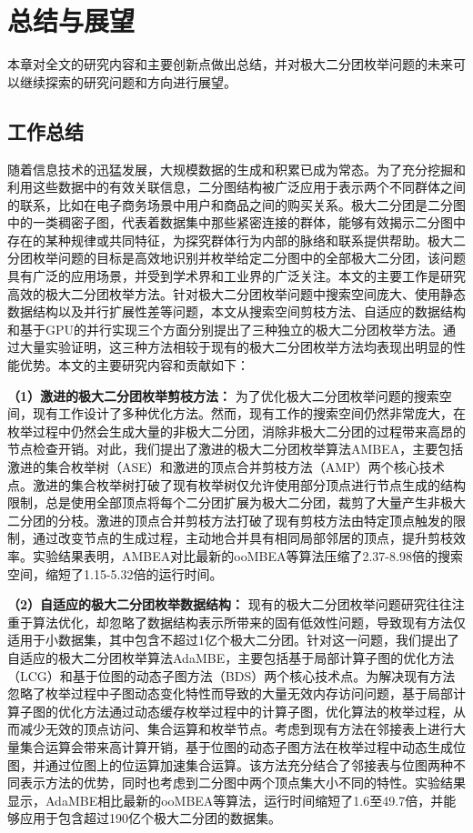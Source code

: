 \chapter{总结与展望}

本章对全文的研究内容和主要创新点做出总结，并对极大二分团枚举问题的未来可以继续探索的研究问题和方向进行展望。

\section{工作总结}

随着信息技术的迅猛发展，大规模数据的生成和积累已成为常态。为了充分挖掘和利用这些数据中的有效关联信息，二分图结构被广泛应用于表示两个不同群体之间的联系，比如在电子商务场景中用户和商品之间的购买关系。极大二分团是二分图中的一类稠密子图，代表着数据集中那些紧密连接的群体，能够有效揭示二分图中存在的某种规律或共同特征，为探究群体行为内部的脉络和联系提供帮助。极大二分团枚举问题的目标是高效地识别并枚举给定二分图中的全部极大二分团，该问题具有广泛的应用场景，并受到学术界和工业界的广泛关注。本文的主要工作是研究高效的极大二分团枚举方法。针对极大二分团枚举问题中搜索空间庞大、使用静态数据结构以及并行扩展性差等问题，本文从搜索空间剪枝方法、自适应的数据结构和基于GPU的并行实现三个方面分别提出了三种独立的极大二分团枚举方法。通过大量实验证明，这三种方法相较于现有的极大二分团枚举方法均表现出明显的性能优势。本文的主要研究内容和贡献如下：

\textbf{（1）激进的极大二分团枚举剪枝方法：} 为了优化极大二分团枚举问题的搜索空间，现有工作设计了多种优化方法。然而，现有工作的搜索空间仍然非常庞大，在枚举过程中仍然会生成大量的非极大二分团，消除非极大二分团的过程带来高昂的节点检查开销。对此，我们提出了激进的极大二分团枚举算法AMBEA，主要包括激进的集合枚举树（ASE）和激进的顶点合并剪枝方法（AMP）两个核心技术点。激进的集合枚举树打破了现有枚举树仅允许使用部分顶点进行节点生成的结构限制，总是使用全部顶点将每个二分团扩展为极大二分团，裁剪了大量产生非极大二分团的分枝。激进的顶点合并剪枝方法打破了现有剪枝方法由特定顶点触发的限制，通过改变节点的生成过程，主动地合并具有相同局部邻居的顶点，提升剪枝效率。实验结果表明，AMBEA对比最新的ooMBEA等算法压缩了2.37-8.98倍的搜索空间，缩短了1.15-5.32倍的运行时间。

\textbf{（2）自适应的极大二分团枚举数据结构：} 现有的极大二分团枚举问题研究往往注重于算法优化，却忽略了数据结构表示所带来的固有低效性问题，导致现有方法仅适用于小数据集，其中包含不超过1亿个极大二分团。针对这一问题，我们提出了自适应的极大二分团枚举算法AdaMBE，主要包括基于局部计算子图的优化方法（LCG）和基于位图的动态子图方法（BDS）两个核心技术点。为解决现有方法忽略了枚举过程中子图动态变化特性而导致的大量无效内存访问问题，基于局部计算子图的优化方法通过动态缓存枚举过程中的计算子图，优化算法的枚举过程，从而减少无效的顶点访问、集合运算和枚举节点。考虑到现有方法在邻接表上进行大量集合运算会带来高计算开销，基于位图的动态子图方法在枚举过程中动态生成位图，并通过位图上的位运算加速集合运算。该方法充分结合了邻接表与位图两种不同表示方法的优势，同时也考虑到二分图中两个顶点集大小不同的特性。实验结果显示，AdaMBE相比最新的ooMBEA等算法，运行时间缩短了1.6至49.7倍，并能够应用于包含超过190亿个极大二分团的数据集。

